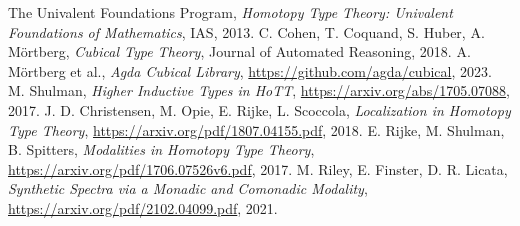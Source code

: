 \documentclass{article}
\theoremstyle{definition}
\begin{document}

\begin{thebibliography}{9}
The Univalent Foundations Program, \emph{Homotopy Type Theory: Univalent Foundations of Mathematics}, IAS, 2013.
C. Cohen, T. Coquand, S. Huber, A. Mörtberg, \emph{Cubical Type Theory}, Journal of Automated Reasoning, 2018.
A. Mörtberg et al., \emph{Agda Cubical Library}, \url{https://github.com/agda/cubical}, 2023.
M. Shulman, \emph{Higher Inductive Types in HoTT}, \url{https://arxiv.org/abs/1705.07088}, 2017.
J. D. Christensen, M. Opie, E. Rijke, L. Scoccola, \emph{Localization in Homotopy Type Theory}, \url{https://arxiv.org/pdf/1807.04155.pdf}, 2018.
E. Rijke, M. Shulman, B. Spitters, \emph{Modalities in Homotopy Type Theory}, \url{https://arxiv.org/pdf/1706.07526v6.pdf}, 2017.
M. Riley, E. Finster, D. R. Licata, \emph{Synthetic Spectra via a Monadic and Comonadic Modality}, \url{https://arxiv.org/pdf/2102.04099.pdf}, 2021.
\end{thebibliography}
\end{document}
